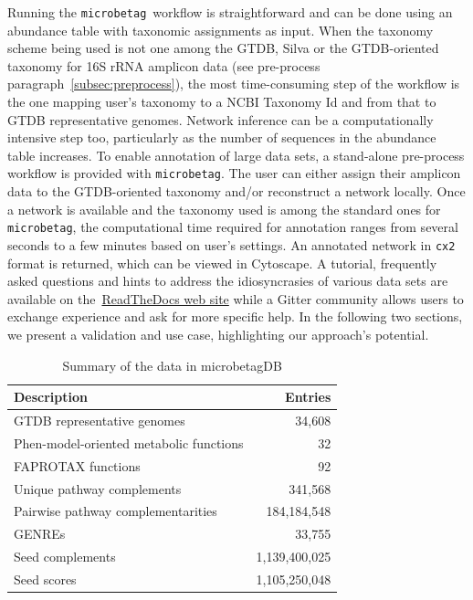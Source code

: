 \documentclass[sn-mathphys,Numbered]{sn-jnl}  %
\theoremstyle{thmstyleone}%
\theoremstyle{thmstyletwo}%
\theoremstyle{thmstylethree}%
\newcommand{\microbetag}{\texttt{microbetag}}
\begin{document}
        Running the \microbetag~workflow is straightforward and can be done using an abundance table with taxonomic assignments as input.
        When the taxonomy scheme being used is not one among the GTDB, Silva or the GTDB-oriented taxonomy for 16S rRNA amplicon data (see pre-process paragraph~\ref{subsec:preprocess}), the most time-consuming step of the workflow is the one mapping user's taxonomy to a NCBI Taxonomy Id and from that to GTDB representative genomes. 
        Network inference can be a computationally intensive step too, particularly as the number of sequences in the abundance table increases. 
        To enable annotation of large data sets, a stand-alone pre-process workflow is provided with \microbetag.
        The user can either assign their amplicon data to the GTDB-oriented taxonomy and/or reconstruct a network locally. 
        Once a network is available and the taxonomy used is among the standard ones for \microbetag, the computational time required for annotation ranges from several seconds to a few minutes based on user's settings.
        An annotated network in \texttt{cx2} format is returned, which can be viewed in Cytoscape.
        A tutorial, frequently asked questions and hints to address the idiosyncrasies of various data sets are available on the~\href{https://hariszaf.github.io/microbetag/}{ReadTheDocs web site} while a Gitter community allows users to exchange experience and ask for more specific help.
        In the following two sections, we present a validation and use case, highlighting our approach's potential.

        \begin{table}[h!]
            \caption[Summary of Data]{
                Summary of the data in microbetagDB
            }
            \label{tab:db}
            \begin{tabular}{lr}
                \toprule
                Description & Entries \\
                \midrule
                GTDB representative genomes & 34,608 \\
                Phen-model-oriented metabolic functions & 32 \\
                FAPROTAX functions & 92 \\
                Unique pathway complements & 341,568 \\
                Pairwise pathway complementarities & 184,184,548\\
                GENREs & 33,755 \\
                Seed complements & 1,139,400,025\\
                Seed scores & 1,105,250,048 \\
                \bottomrule
            \end{tabular}
        \end{table}
\end{document}
